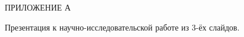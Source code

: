 \begin{center}
    ПРИЛОЖЕНИЕ А
\end{center}

Презентация к научно-исследовательской работе из 3-ёх слайдов.